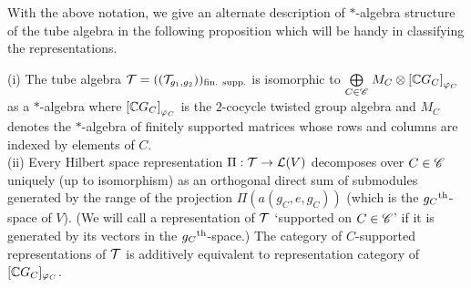 With the above notation, we give an alternate description of $ * $-algebra structure of the tube algebra in the following proposition which will be handy in classifying the representations.
\begin{thm}\label{diagtubalg}
(i) The tube algebra $ \mathcal T  = (( \mathcal T_{g_1 , g_2} ))_{\text{fin. supp.}}$ is isomorphic to $ \underset{C \in \mathscr C}{\bigoplus} \; M_C \otimes \left[\mathbb{C} G_C\right]_{\varphi_C} $ as a $ * $-algebra where $ \left[\mathbb{C} G_C\right]_{\varphi_C}  $ is the $ 2 $-cocycle twisted group algebra and $ M_C $ denotes the $ * $-algebra of finitely supported matrices whose rows and columns are indexed by elements of $ C $.\\
(ii) Every Hilbert space representation $\Pi : \mathcal T \rightarrow \mathcal L (V)$ decomposes over $ C \in \mathscr C $ uniquely (up to isomorphism) as an orthogonal direct sum of submodules generated by the range of the projection $\Pi (a(g_C, e, g_C)) $ (which is the $ {g_C}^{\text{th}} $-space of $ V $).
(We will call a representation of $ \mathcal T $ `supported on $ C \in \mathscr C$' if it is generated by its vectors in the $ {g_C}^{\text{th}} $-space.)
The category of $ C $-supported representations of $ \mathcal T $ is additively equivalent to representation category of $ [\mathbb{C} G_C]_{\varphi_C} $.
\end{thm}
